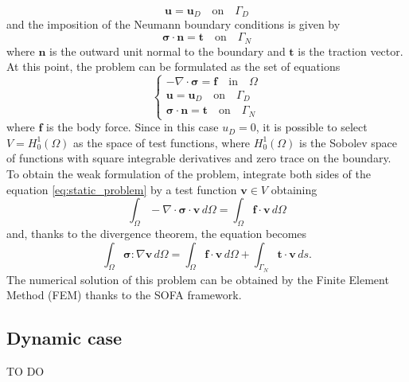 \begin{equation}
    \bm{u} = \bm{u}_D \quad \text{on} \quad \Gamma_D
\end{equation}
and the imposition of the Neumann boundary conditions is given by
\begin{equation}
    \bm{\sigma} \cdot \bm{n} = \bm{t} \quad \text{on} \quad \Gamma_N
\end{equation}
where \( \bm{n} \) is the outward unit normal to the boundary and \( \bm{t} \) is the traction vector. 
At this point, the problem can be formulated as the set of equations
\begin{equation}
    \begin{cases}
        -\nabla \cdot \bm{\sigma} = \bm{f} \quad \text{in} \quad \Omega \\
        \bm{u} = \bm{u}_D \quad \text{on} \quad \Gamma_D \\
        \bm{\sigma} \cdot \bm{n} = \bm{t} \quad \text{on} \quad \Gamma_N
    \end{cases}
\label{eq:static_problem}
\end{equation}
where \( \bm{f} \) is the body force. 
Since in this case \(u_D = 0\), it is possible to select \(V = H^1_0(\Omega)\) as the space of test functions, where \(H^1_0(\Omega)\) is the Sobolev space of functions with square integrable derivatives and zero trace on the boundary. To obtain the weak formulation of the problem, integrate both sides of the equation \eqref{eq:static_problem} by a test function \( \bm{v} \in V \) obtaining 
\begin{equation}
    \int_{\Omega} -\nabla \cdot \bm{\sigma} \cdot \bm{v} \, d\Omega = \int_{\Omega} \bm{f} \cdot \bm{v} \, d\Omega
\end{equation}
and, thanks to the divergence theorem, the equation becomes
\begin{equation}
    \int_{\Omega} \bm{\sigma} : \nabla \bm{v} \, d\Omega = \int_{\Omega} \bm{f} \cdot \bm{v} \, d\Omega + \int_{\Gamma_N} \bm{t} \cdot \bm{v} \, ds.
\end{equation}
The numerical solution of this problem can be obtained by the Finite Element Method (FEM) thanks to the SOFA framework.

\subsection{Dynamic case}
TO DO